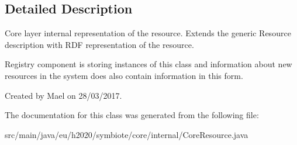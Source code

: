 \subsection{Detailed Description}
Core layer internal representation of the resource. Extends the generic Resource description with R\+DF representation of the resource.

Registry component is storing instances of this class and information about new resources in the system does also contain information in this form.

Created by Mael on 28/03/2017. 

The documentation for this class was generated from the following file\+:\begin{DoxyCompactItemize}
\item 
src/main/java/eu/h2020/symbiote/core/internal/Core\+Resource.\+java\end{DoxyCompactItemize}
